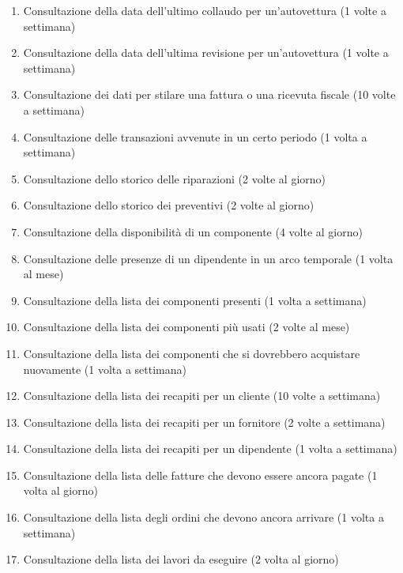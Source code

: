 \begin{enumerate}
			\item \label{op:show_collaudo}Consultazione della data dell’ultimo collaudo per un’autovettura (1 volte a settimana)
			\item \label{op:show_revisione}Consultazione della data dell’ultima revisione per un’autovettura (1 volte a settimana)
			\item \label{op:show_fattura}Consultazione dei dati per stilare una fattura o una ricevuta fiscale (10 volte a settimana)
			\item \label{op:show_transazioni}Consultazione delle transazioni avvenute in un certo periodo (1 volta a settimana)
			\item \label{op:show_riparazioni}Consultazione dello storico delle riparazioni (2 volte al giorno)
			\item \label{op:show_preventivi}Consultazione dello storico dei preventivi (2 volte al giorno)
			\item \label{op:check_componente}Consultazione della disponibilità di un componente (4 volte al giorno)
			\item \label{op:check_turni}Consultazione delle presenze di un dipendente in un arco temporale (1 volta al mese)
			\item \label{op:list_componenti}Consultazione della lista dei componenti presenti (1 volta a settimana)
			\item \label{op:stats_componenti}Consultazione della lista dei componenti più usati (2 volte al mese)
			\item \label{op:tobuy_componenti}Consultazione della lista dei componenti che si dovrebbero acquistare nuovamente (1 volta a settimana)
			\item \label{op:show_recapiti_cliente}Consultazione della lista dei recapiti per un cliente (10 volte a settimana)
			\item \label{op:show_recapiti_fornitore}Consultazione della lista dei recapiti per un fornitore (2 volte a settimana)
			\item \label{op:show_recapiti_operatore}Consultazione della lista dei recapiti per un dipendente (1 volta a settimana)
			\item \label{op:list_fatture_pending}Consultazione della lista delle fatture che devono essere ancora pagate (1 volta al giorno)
			\item \label{op:list_ordini_pending}Consultazione della lista degli ordini che devono ancora arrivare (1 volta a settimana)
			\item \label{op:todo_list}Consultazione della lista dei lavori da eseguire (2 volta al giorno)

\end{enumerate}
